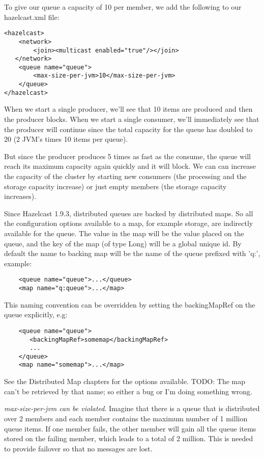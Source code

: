 To give our queue a capacity of 10 per member, we add the following to our hazelcast.xml file:
\begin{lstlisting}
<hazelcast>
    <network>
        <join><multicast enabled="true"/></join>
   </network>
    <queue name="queue">
        <max-size-per-jvm>10</max-size-per-jvm>
    </queue>
</hazelcast>
\end{lstlisting}
When we start a single producer, we'll see that 10 items are produced and then the producer blocks. When we start a single consumer, we'll immediately see that the producer will continue since the total capacity for the queue has doubled to 20 (2 JVM's times 10 items per queue). 

But since the producer produces 5 times as fast as the consume, the queue will reach its maximum capacity again quickly and it will block. We can can increase the capacity of the cluster by starting new consumers (the processing and the storage capacity increase) or just empty members (the storage capacity increases).

Since Hazelcast 1.9.3, distributed queues are backed by distributed maps. So all the configuration options available to a map, for example storage, are indirectly available for the queue. The value in the map will be the value placed on the queue, and the key of the map (of type Long) will be a global unique id. By default the name to backing map will be the name of the queue prefixed with 'q:', example:
\begin{lstlisting}
    <queue name="queue">...</queue>
    <map name="q:queue">...</map>
\end{lstlisting}

This naming convention can be overridden by setting the backingMapRef on the queue explicitly, e.g:
\begin{lstlisting}
    <queue name="queue">
       <backingMapRef>somemap</backingMapRef>
       ... 
    </queue>
    <map name="somemap">...</map>
\end{lstlisting}
See the Distributed Map chapters for the options available.
TODO: The map can't be retrieved by that name; so either a bug or I'm doing something wrong.

\emph{max-size-per-jvm can be violated}. Imagine that there is a queue that is distributed over 2 members and each member contains the maximum number of 1 million queue items. If one member fails, the other member will gain all the queue items stored on the failing member, which leads to a total of 2 million. This is needed to provide failover so that no messages are lost. 

